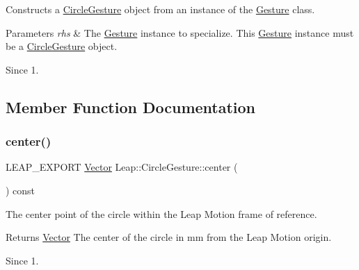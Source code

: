 Constructs a \hyperlink{class_leap_1_1_circle_gesture}{Circle\+Gesture} object from an instance of the \hyperlink{class_leap_1_1_gesture}{Gesture} class.


\begin{DoxyCodeInclude}
\end{DoxyCodeInclude}



\begin{DoxyParams}{Parameters}
{\em rhs} & The \hyperlink{class_leap_1_1_gesture}{Gesture} instance to specialize. This \hyperlink{class_leap_1_1_gesture}{Gesture} instance must be a \hyperlink{class_leap_1_1_circle_gesture}{Circle\+Gesture} object. \\
\hline
\end{DoxyParams}
\begin{DoxySince}{Since}
1. 
\end{DoxySince}


\subsection{Member Function Documentation}
\mbox{\label{class_leap_1_1_circle_gesture_aa37a274c3c68607c696c1b1580574105}} 
\subsubsection{\texorpdfstring{center()}{center()}}
{\footnotesize\ttfamily L\+E\+A\+P\+\_\+\+E\+X\+P\+O\+RT \hyperlink{struct_leap_1_1_vector}{Vector} Leap\+::\+Circle\+Gesture\+::center (\begin{DoxyParamCaption}{ }\end{DoxyParamCaption}) const}

The center point of the circle within the Leap Motion frame of reference.


\begin{DoxyCodeInclude}
\end{DoxyCodeInclude}
 \begin{DoxyReturn}{Returns}
\hyperlink{struct_leap_1_1_vector}{Vector} The center of the circle in mm from the Leap Motion origin. 
\end{DoxyReturn}
\begin{DoxySince}{Since}
1. 
\end{DoxySince}
\mbox{\label{class_leap_1_1_circle_gesture_a8935a8a71b0a174a1656ff2caab80a06}} 
